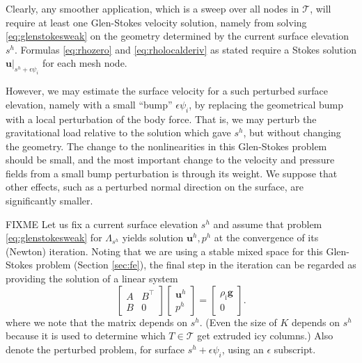 \documentclass[letterpaper,final,12pt,reqno]{amsart}
\theoremstyle{claim}
\newcommand{\eps}{\epsilon}
\newcommand{\bg}{\mathbf{g}}
\newcommand{\bu}{\mathbf{u}}
\newcommand{\rhoi}{\rho_{\text{i}}}
\numberwithin{equation}{section}
\numberwithin{figure}{section}
\numberwithin{table}{section}
\numberwithin{theorem}{section}
\begin{document}
Clearly, any smoother application, which is a sweep over all nodes in $\mathcal{T}$, will require at least one Glen-Stokes velocity solution, namely from solving \eqref{eq:glenstokesweak} on the geometry determined by the current surface elevation $s^h$.  Formulas \eqref{eq:rhozero} and \eqref{eq:rholocalderiv} as stated require a Stokes solution $\bu|_{s^h+\eps\psi_i}$ for each mesh node.

However, we may estimate the surface velocity for a such perturbed surface elevation, namely with a small ``bump'' $\eps\psi_i$, by replacing the geometrical bump with a local perturbation of the body force.  That is, we may perturb the gravitational load relative to the solution which gave $s^h$, but without changing the geometry.  The change to the nonlinearities in this Glen-Stokes problem should be small, and the most important change to the velocity and pressure fields from a small bump perturbation is through its weight.  We suppose that other effects, such as a perturbed normal direction on the surface, are significantly smaller.

FIXME Let us fix a current surface elevation $s^h$ and assume that problem \eqref{eq:glenstokesweak} for $\Lambda_{s^h}$ yields solution $\bu^h,p^h$ at the convergence of its (Newton) iteration.  Noting that we are using a stable mixed space for this Glen-Stokes problem (Section \ref{sec:fe}), the final step in the iteration can be regarded as providing the solution of a linear system
\begin{equation}
    \begin{bmatrix} A & B^\top \\
                    B & 0      \end{bmatrix}
    \begin{bmatrix} \bu^h \\ p^h \end{bmatrix}
    = \begin{bmatrix} \rhoi \bg \\ 0 \end{bmatrix}.  \label{eq:system}
\end{equation}
where we note that the matrix depends on $s^h$.  (Even the size of $K$ depends on $s^h$ because it is used to determine which $T\in\mathcal{T}$ get extruded icy columns.)  Also denote the perturbed problem, for surface $s^h + \eps \psi_i$, using an $\eps$ subscript.
\end{document}
